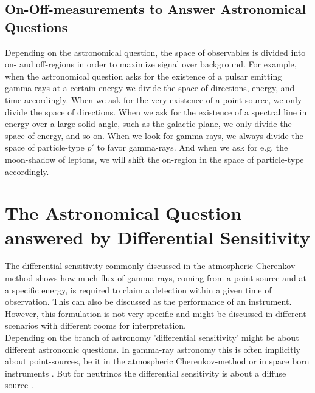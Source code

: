 \documentclass{article}%
\begin{document}
        \subsection*{On-Off-measurements to Answer Astronomical Questions}
            Depending on the astronomical question, the space of observables is divided into on- and off-regions in order to maximize signal over background.
            For example, when the astronomical question asks for the existence of a pulsar emitting gamma-rays at a certain energy we divide the space of directions, energy, and time accordingly.
            When we ask for the very existence of a point-source, we only divide the space of directions.
            When we ask for the existence of a spectral line in energy over a large solid angle, such as the galactic plane, we only divide the space of energy, and so on.
            When we look for gamma-rays, we always divide the space of particle-type $p'$ to favor gamma-rays.
            And when we ask for e.g. the moon-shadow of leptons, we will shift the on-region in the space of particle-type accordingly.
    \section{The Astronomical Question answered by Differential Sensitivity}
        \label{SecAstronomicalQuastion}
        The differential sensitivity commonly discussed in the atmospheric Cherenkov-method shows how much flux of gamma-rays, coming from a point-source and at a specific energy, is required to claim a detection within a given time of observation.
        This can also be discussed as the performance of an instrument.
        \\
        However, this formulation is not very specific and might be discussed in different scenarios with different rooms for interpretation.
        \\
        Depending on the branch of astronomy 'differential sensitivity' might be about different astronomic questions.
        In gamma-ray astronomy this is often implicitly about point-sources, be it in the atmospheric Cherenkov-method \cite{cta2018baseline,cortina2016machete} or in space born instruments \cite{wood2016fermiperformance}.
        But for neutrinos the differential sensitivity is about a diffuse source \cite{marinelli2021km3netarca}.
\end{document}
